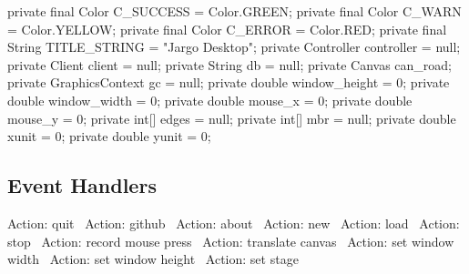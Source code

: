 \nwenddocs{}\plusendmoddef
private final Color C_SUCCESS = Color.GREEN;
private final Color C_WARN = Color.YELLOW;
private final Color C_ERROR = Color.RED;
private final String TITLE_STRING = "Jargo Desktop";
\eatline
{}\nwendcode{}\nwdocspar
\nwenddocs{}\plusendmoddef
private Controller controller = null;
private Client client = null;
private String db = null;
private Canvas can_road;
\eatline
{}\nwendcode{}\nwdocspar
\nwenddocs{}\plusendmoddef
private GraphicsContext gc = null;
private double window_height = 0;
private double window_width = 0;
private double mouse_x = 0;
private double mouse_y = 0;
private int[] edges = null;
private int[] mbr = null;
private double xunit = 0;
private double yunit = 0;
\nwendcode{}\nwdocspar

\subsection{Event Handlers}
\nwenddocs{}\endmoddef{}
\LA{}Action: quit~{\nwtagstyle{}}\RA{}
\LA{}Action: github~{\nwtagstyle{}}\RA{}
\LA{}Action: about~{\nwtagstyle{}}\RA{}
\LA{}Action: new~{\nwtagstyle{}}\RA{}
\LA{}Action: load~{\nwtagstyle{}}\RA{}
\LA{}Action: stop~{\nwtagstyle{}}\RA{}
\LA{}Action: record mouse press~{\nwtagstyle{}}\RA{}
\LA{}Action: translate canvas~{\nwtagstyle{}}\RA{}
\LA{}Action: set window width~{\nwtagstyle{}}\RA{}
\LA{}Action: set window height~{\nwtagstyle{}}\RA{}
\LA{}Action: set stage~{\nwtagstyle{}}\RA{}
\nwendcode{}\nwdocspar

